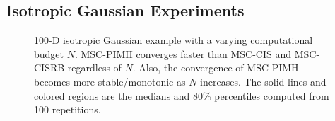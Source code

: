 
\subsection{Isotropic Gaussian Experiments}
\begin{figure}[H]
  \centering
  \caption{100-D isotropic Gaussian example with a varying computational budget \(N\).
    MSC-PIMH converges faster than MSC-CIS and MSC-CISRB regardless of \(N\).
    Also, the convergence of MSC-PIMH becomes more stable/monotonic as \(N\) increases.
    The solid lines and colored regions are the medians and 80\% percentiles computed from 100 repetitions.
  }\label{fig:gaussian}
\end{figure}
